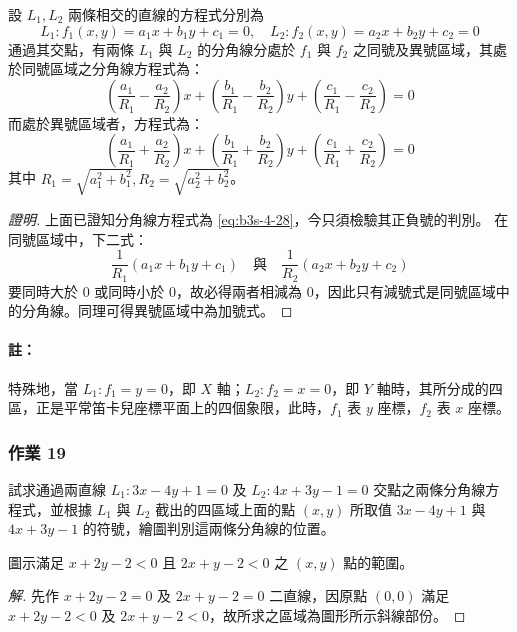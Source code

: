 \begin{proposition}
\label{prop:b3s-4-2}
設 $L_1, L_2$ 兩條相交的直線的方程式分別為
\[ L_1 : f_1(x, y) = a_1 x + b_1 y + c_1 = 0, \quad L_2 : f_2(x, y) = a_2 x + b_2 y + c_2 = 0 \]
通過其交點，有兩條 $L_1$ 與 $L_2$ 的分角線分處於 $f_1$ 與 $f_2$ 之同號及異號區域，其處於同號區域之分角線方程式為：
\[ \left(\frac{a_1}{R_1} - \frac{a_2}{R_2}\right)x + \left(\frac{b_1}{R_1} - \frac{b_2}{R_2}\right)y + \left(\frac{c_1}{R_1} - \frac{c_2}{R_2}\right) = 0 \]
而處於異號區域者，方程式為：
\[ \left(\frac{a_1}{R_1} + \frac{a_2}{R_2}\right)x + \left(\frac{b_1}{R_1} + \frac{b_2}{R_2}\right)y + \left(\frac{c_1}{R_1} + \frac{c_2}{R_2}\right) = 0 \]
其中 $R_1 = \sqrt{a_1^2 + b_1^2}, R_2 = \sqrt{a_2^2 + b_2^2}$。
\end{proposition}

\begin{proof}[證明]
上面已證知分角線方程式為 \eqref{eq:b3s-4-28}，今只須檢驗其正負號的判別。
在同號區域中，下二式：
\[ \frac{1}{R_1}(a_1 x + b_1 y + c_1) \quad\text{與}\quad \frac{1}{R_2}(a_2 x + b_2 y + c_2) \]
要同時大於 0 或同時小於 0，故必得兩者相減為 0，因此只有減號式是同號區域中的分角線。同理可得異號區域中為加號式。
\end{proof}

\paragraph*{註：}特殊地，當 $L_1 : f_1 = y = 0$，即 $X$ 軸；$L_2 : f_2 = x = 0$，即 $Y$ 軸時，其所分成的四區，正是平常笛卡兒座標平面上的四個象限，此時，$f_1$ 表 $y$ 座標，$f_2$ 表 $x$ 座標。

\subsubsection*{作業 19}
試求通過兩直線 $L_1 : 3x - 4y + 1 = 0$ 及 $L_2 : 4x + 3y - 1 = 0$ 交點之兩條分角線方程式，並根據 $L_1$ 與 $L_2$ 截出的四區域上面的點 $(x, y)$ 所取值 $3x - 4y + 1$ 與 $4x + 3y - 1$ 的符號，繪圖判別這兩條分角線的位置。

\begin{example}[例 17]
圖示滿足 $x + 2y - 2 < 0$ 且 $2x + y - 2 < 0$ 之 $(x, y)$ 點的範圍。
\end{example}

\begin{proof}[解]
先作 $x + 2y - 2 = 0$ 及 $2x + y - 2 = 0$ 二直線，因原點 $(0, 0)$ 滿足 $x + 2y - 2 < 0$ 及 $2x + y - 2 < 0$，故所求之區域為圖形所示斜線部份。
\end{proof}

